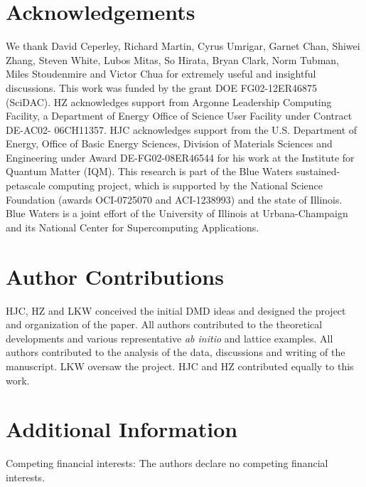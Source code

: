 \section{Acknowledgements} 
We thank  David Ceperley,  Richard Martin, Cyrus Umrigar,  Garnet Chan,  Shiwei Zhang, Steven White,  
Lubos Mitas, So Hirata, Bryan Clark, Norm Tubman, Miles Stoudenmire and Victor Chua for extremely useful and insightful discussions. 
This work was funded by the grant DOE FG02-12ER46875 (SciDAC). HZ acknowledges support from Argonne Leadership Computing Facility, a Department of Energy Office of Science User Facility under Contract DE-AC02- 06CH11357. HJC acknowledges support from the U.S. Department of Energy, 
Office of Basic Energy Sciences, Division of Materials Sciences and Engineering under Award DE-FG02-08ER46544 for his work at the Institute for Quantum Matter (IQM). 
This research is part of the Blue Waters sustained-petascale computing project, which is supported by the National Science Foundation (awards OCI-0725070 and ACI-1238993) and the state of Illinois. Blue Waters is a joint effort of the University of Illinois at Urbana-Champaign and its National Center for Supercomputing Applications.

\section*{Author Contributions}
HJC, HZ and LKW conceived the initial DMD ideas and designed the project and organization of the paper. 
All authors contributed to the theoretical developments and various representative \textit{ab initio} and lattice examples. 
All authors contributed to the analysis of the data, discussions and writing of the manuscript. 
LKW oversaw the project. HJC and HZ contributed equally to this work.
 
\section*{Additional Information}
Competing financial interests: The authors declare no competing financial interests.
